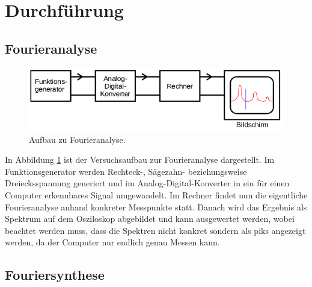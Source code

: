 \section{Durchführung}
\label{sec:Durchführung}

\subsection{Fourieranalyse}
\begin{figure}[H]
  \centering
  \includegraphics{content/images/analyse2.png}
  \caption{Aufbau zu Fourieranalyse.}
  \label{fig:anal}
\end{figure}
In Abbildung \ref{fig:anal} ist der Versuchsaufbau zur Fourieranalyse
dargestellt. Im Funktionsgenerator werden Rechteck-, Sägezahn- beziehungsweise
Dreiecksspannung generiert und im Analog-Digital-Konverter in ein für einen
Computer erkennbares Signal umgewandelt. Im Rechner findet nun die
eigentliche Fourieranalyse anhand konkreter Messpunkte statt.
Danach wird das Ergebnis als Spektrum auf dem Osziloskop abgebildet
und kann ausgewertet werden, wobei beachtet werden muss, dass die
Spektren nicht konkret sondern als piks angezeigt werden, da der
Computer nur endlich genau Messen kann.

\subsection{Fouriersynthese}
